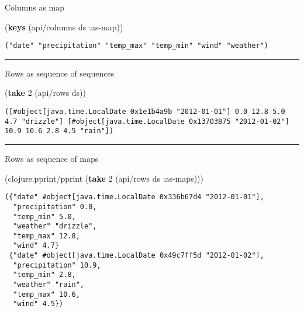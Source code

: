 \documentclass[]{article}
\newenvironment{Shaded}{\begin{snugshade}}{\end{snugshade}}
\newcommand{\KeywordTok}[1]{\textcolor[rgb]{0.13,0.29,0.53}{\textbf{#1}}}
\newcommand{\DecValTok}[1]{\textcolor[rgb]{0.00,0.00,0.81}{#1}}
\newcommand{\AttributeTok}[1]{\textcolor[rgb]{0.77,0.63,0.00}{#1}}
\newcommand{\NormalTok}[1]{#1}
\begin{document}
Columns as map

\begin{Shaded}
\begin{Highlighting}[]
\NormalTok{(}\KeywordTok{keys}\NormalTok{ (api/columns ds }\AttributeTok{:as-map}\NormalTok{))}
\end{Highlighting}
\end{Shaded}

\begin{verbatim}
("date" "precipitation" "temp_max" "temp_min" "wind" "weather")
\end{verbatim}

\begin{center}\rule{0.5\linewidth}{0.5pt}\end{center}

Rows as sequence of sequences

\begin{Shaded}
\begin{Highlighting}[]
\NormalTok{(}\KeywordTok{take} \DecValTok{2}\NormalTok{ (api/rows ds))}
\end{Highlighting}
\end{Shaded}

\begin{verbatim}
([#object[java.time.LocalDate 0x1e1b4a9b "2012-01-01"] 0.0 12.8 5.0 4.7 "drizzle"] [#object[java.time.LocalDate 0x13703875 "2012-01-02"] 10.9 10.6 2.8 4.5 "rain"])
\end{verbatim}

\begin{center}\rule{0.5\linewidth}{0.5pt}\end{center}

Rows as sequence of maps

\begin{Shaded}
\begin{Highlighting}[]
\NormalTok{(clojure.pprint/pprint (}\KeywordTok{take} \DecValTok{2}\NormalTok{ (api/rows ds }\AttributeTok{:as-maps}\NormalTok{)))}
\end{Highlighting}
\end{Shaded}

\begin{verbatim}
({"date" #object[java.time.LocalDate 0x336b67d4 "2012-01-01"],
  "precipitation" 0.0,
  "temp_min" 5.0,
  "weather" "drizzle",
  "temp_max" 12.8,
  "wind" 4.7}
 {"date" #object[java.time.LocalDate 0x49c7ff5d "2012-01-02"],
  "precipitation" 10.9,
  "temp_min" 2.8,
  "weather" "rain",
  "temp_max" 10.6,
  "wind" 4.5})
\end{verbatim}
\end{document}
